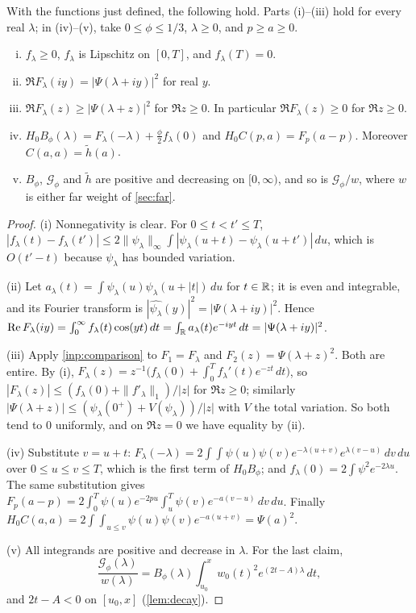 \begin{lemma}\label{lem:envelope}
With the functions just defined, the following hold. Parts (i)--(iii) hold for every
real $\lambda$; in (iv)--(v), take $0\le\phi\le1/3$, $\lambda\ge0$, and $p\ge a\ge0$.
\begin{enumerate}[(i)]
  \item $f_\lambda\ge0$, $f_\lambda$ is Lipschitz on $[0,T]$, and $f_\lambda(T)=0$.
  \item $\Re F_\lambda(iy)=|\Psi(\lambda+iy)|^2$ for real $y$.
  \item $\Re F_\lambda(z)\ge|\Psi(\lambda+z)|^2$ for $\Re z\ge0$. In particular $\Re F_\lambda(z)\ge0$
    for $\Re z\ge0$.
  \item $H_0B_\phi(\lambda)=F_\lambda(-\lambda)+\frac\phi2f_\lambda(0)$ and
    $H_0C(p,a)=F_p(a-p)$. Moreover $C(a,a)=\tilde h(a)$.
  \item $B_\phi$, $\mathcal G_\phi$ and $\tilde h$ are positive and decreasing on $[0,\infty)$, and so is
    $\mathcal G_\phi/w$, where $w$ is either far weight of \cref{sec:far}.
\end{enumerate}
\end{lemma}

\begin{proof}
(i) Nonnegativity is clear. For $0\le t<t'\le T$,
$|f_\lambda(t)-f_\lambda(t')|\le2\|\psi_\lambda\|_\infty\int|\psi_\lambda(u+t)-\psi_\lambda(u+t')|\,du$,
which is $O(t'-t)$ because $\psi_\lambda$ has bounded variation.

(ii) Let $a_\lambda(t)=\int\psi_\lambda(u)\psi_\lambda(u+|t|)\,du$ for $t\in\mathbb{R}$; it is even and
integrable, and its Fourier transform is $|\widehat{\psi_\lambda}(y)|^2=|\Psi(\lambda+iy)|^2$.
Hence $\operatorname{Re} F_\lambda(iy)=\int_0^\infty f_\lambda(t)\cos(yt)\,dt=\int_{\mathbb{R}} a_\lambda(t)e^{-iyt}\,dt
=|\Psi(\lambda+iy)|^2$.

(iii) Apply \cref{inp:comparison} to $F_1=F_\lambda$ and $F_2(z)=\Psi(\lambda+z)^2$. Both are
entire. By (i), $F_\lambda(z)=z^{-1}\bigl(f_\lambda(0)+\int_0^Tf_\lambda'(t)e^{-zt}\,dt\bigr)$, so
$|F_\lambda(z)|\le(f_\lambda(0)+\|f'_\lambda\|_1)/|z|$ for $\Re z\ge0$; similarly
$|\Psi(\lambda+z)|\le(\psi_\lambda(0^+)+V(\psi_\lambda))/|z|$ with $V$ the total variation. So both tend to
$0$ uniformly, and on $\Re z=0$ we have equality by (ii).

(iv) Substitute $v=u+t$:
$F_\lambda(-\lambda)=2\int\!\!\int\psi(u)\psi(v)e^{-\lambda(u+v)}e^{\lambda(v-u)}\,dv\,du$ over $0\le u\le v\le T$,
which is the first term of $H_0B_\phi$; and $f_\lambda(0)=2\int\psi^2e^{-2\lambda u}$. The same
substitution gives $F_p(a-p)=2\int_0^T\psi(u)e^{-2pu}\int_u^T\psi(v)e^{-a(v-u)}\,dv\,du$. Finally
$H_0C(a,a)=2\int\!\!\int_{u\le v}\psi(u)\psi(v)e^{-a(u+v)}=\Psi(a)^2$.

(v) All integrands are positive and decrease in $\lambda$. For the last claim,
\[
  \frac{\mathcal G_\phi(\lambda)}{w(\lambda)}=B_\phi(\lambda)\int_{u_0}^xw_0(t)^2e^{(2t-A)\lambda}\,dt,
\]
and $2t-A<0$ on $[u_0,x]$ (\cref{lem:decay}).
\end{proof}

